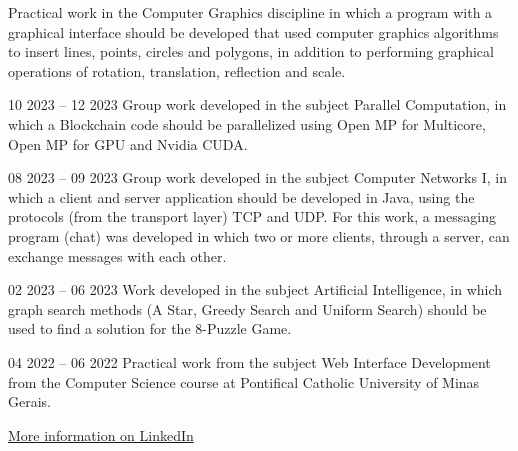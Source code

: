 \documentclass[10pt,a4paper,ragged2e,withhyper]{altacv}
\begin{document}
\begin{paracol}{2}
            Practical work in the Computer Graphics discipline in which a program with a graphical interface should be developed that used computer graphics algorithms to insert lines, points, circles and polygons, in addition to performing graphical operations of rotation, translation, reflection and scale.\\
            \divider

            {
            }{10 2023 -- 12 2023}{}
            Group work developed in the subject Parallel Computation, in which a Blockchain code should be parallelized using Open MP for Multicore, Open MP for GPU and Nvidia CUDA.\\
            \divider

            {
            }{08 2023 -- 09 2023}{}
            Group work developed in the subject Computer Networks I, in which a client and server application should be developed in Java, using the protocols (from the transport layer) TCP and UDP. For this work, a messaging program (chat) was developed in which two or more clients, through a server, can exchange messages with each other.\\
            \divider
        
            {
            }{02 2023 -- 06 2023}{}
            Work developed in the subject Artificial Intelligence, in which graph search methods (A Star, Greedy Search and Uniform Search) should be used to find a solution for the 8-Puzzle Game.\\
            \divider
            
            {
            }{04 2022 -- 06 2022}{}
            Practical work from the subject Web Interface Development from the Computer Science course at Pontifical Catholic University of Minas Gerais.\\
            \divider

            {\large\color{emphasis}\href{https://www.linkedin.com/in/henriquemcc/details/projects/}{More information on LinkedIn}}
    \end{paracol}
\end{document}
